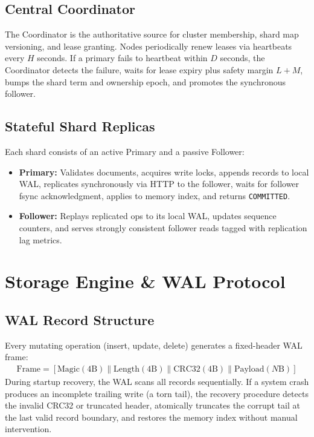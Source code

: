 \documentclass[10pt,journal,compsoc]{IEEEtran}
\begin{document}
\subsection{Central Coordinator}
The Coordinator is the authoritative source for cluster membership, shard map versioning, and lease granting. Nodes periodically renew leases via heartbeats every $H$ seconds. If a primary fails to heartbeat within $D$ seconds, the Coordinator detects the failure, waits for lease expiry plus safety margin $L + M$, bumps the shard term and ownership epoch, and promotes the synchronous follower.

\subsection{Stateful Shard Replicas}
Each shard consists of an active Primary and a passive Follower:
\begin{itemize}
    \item \textbf{Primary:} Validates documents, acquires write locks, appends records to local WAL, replicates synchronously via HTTP to the follower, waits for follower fsync acknowledgment, applies to memory index, and returns \texttt{COMMITTED}.
    \item \textbf{Follower:} Replays replicated ops to its local WAL, updates sequence counters, and serves strongly consistent follower reads tagged with replication lag metrics.
\end{itemize}

\section{Storage Engine \& WAL Protocol}

\subsection{WAL Record Structure}
Every mutating operation (insert, update, delete) generates a fixed-header WAL frame:
\begin{align}
\text{Frame} = [\text{Magic}(4\text{B}) \parallel \text{Length}(4\text{B}) \parallel \text{CRC32}(4\text{B}) \parallel \text{Payload}(N\text{B})]
\end{align}
During startup recovery, the WAL scans all records sequentially. If a system crash produces an incomplete trailing write (a torn tail), the recovery procedure detects the invalid CRC32 or truncated header, atomically truncates the corrupt tail at the last valid record boundary, and restores the memory index without manual intervention.
\end{document}
